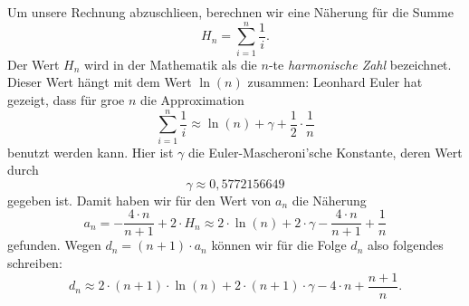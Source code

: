 Um unsere Rechnung abzuschlie\3en, berechnen wir eine N\"{a}herung f\"{u}r die Summe 
\[ H_n = \sum\limits_{i=1}^{n}\frac{1}{i}.\]
Der Wert $H_n$ wird in der Mathematik als die $n$-te \emph{harmonische Zahl} bezeichnet.
Dieser Wert h\"{a}ngt mit dem Wert $\ln(n)$ zusammen: Leonhard Euler hat gezeigt, dass f\"{u}r
gro\3e $n$ die Approximation
\[ \sum\limits_{i=1}^n \frac{1}{i} \approx \ln(n) + \gamma + \frac{1}{2} \cdot \frac{1}{n} \]
benutzt werden kann.  Hier ist $\gamma$ die Euler-Mascheroni'sche Konstante, deren Wert durch
\[ \gamma \approx 0,5772156649 \]
gegeben ist.  Damit haben wir f\"{u}r den Wert von $a_n$ die N\"{a}herung
\[ a_n = - \frac{4 \cdot n}{n+1} + 2 \cdot H_n \approx  
         2 \cdot \ln(n) + 2 \cdot \gamma - \frac{4 \cdot n}{n+1} + \frac{1}{n} 
\]
gefunden. Wegen $d_n = (n+1) \cdot a_n$ k\"{o}nnen wir f\"{u}r die Folge $d_n$ also folgendes schreiben:
\[ d_n \approx  
       2 \cdot (n + 1) \cdot \ln(n) + 2 \cdot (n+1) \cdot \gamma - 4 \cdot n + \frac{n+1}{n}.
\]


